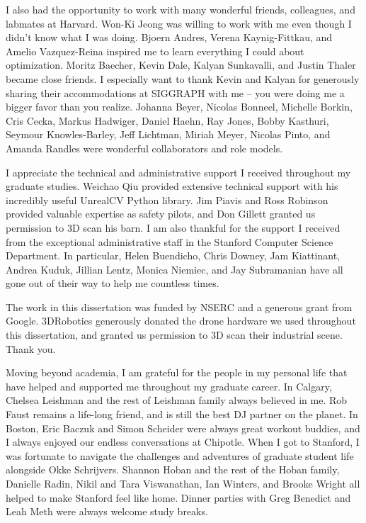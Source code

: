 I also had the opportunity to work with many wonderful friends, colleagues, and labmates at Harvard.
Won-Ki Jeong was willing to work with me even though I didn't know what I was doing.
Bjoern Andres, Verena Kaynig-Fittkau, and Amelio Vazquez-Reina inspired me to learn everything I could about optimization.
Moritz Baecher, Kevin Dale, Kalyan Sunkavalli, and Justin Thaler became close friends.
I especially want to thank Kevin and Kalyan for generously sharing their accommodations at SIGGRAPH with me -- you were doing me a bigger favor than you realize.  
Johanna Beyer, Nicolas Bonneel, Michelle Borkin, Cris Cecka, Markus Hadwiger, Daniel Haehn, Ray Jones, Bobby Kasthuri, Seymour Knowles-Barley,  Jeff Lichtman, Miriah Meyer, Nicolas Pinto, and Amanda Randles were wonderful collaborators and role models.

I appreciate the technical and administrative support I received throughout my graduate studies.
Weichao Qiu provided extensive technical support with his incredibly useful UnrealCV Python library.
Jim Piavis and Ross Robinson provided valuable expertise as safety pilots, and Don Gillett granted us permission to 3D scan his barn.
I am also thankful for the support I received from the exceptional administrative staff in the Stanford Computer Science Department.
In particular, Helen Buendicho, Chris Downey, Jam Kiattinant, Andrea Kuduk, Jillian Lentz, Monica Niemiec, and Jay Subramanian have all gone out of their way to help me countless times.

The work in this dissertation was funded by NSERC and a generous grant from Google.
3DRobotics generously donated the drone hardware we used throughout this dissertation, and granted us permission to 3D scan their industrial scene.
Thank you.

Moving beyond academia, I am grateful for the people in my personal life that have helped and supported me throughout my graduate career.
In Calgary, Chelsea Leishman and the rest of Leishman family always believed in me.
Rob Faust remains a life-long friend, and is still the best DJ partner on the planet.
In Boston, Eric Baczuk and Simon Scheider were always great workout buddies, and I always enjoyed our endless conversations at Chipotle.
When I got to Stanford, I was fortunate to navigate the challenges and adventures of graduate student life alongside Okke Schrijvers.
Shannon Hoban and the rest of the Hoban family, Danielle Radin, Nikil and Tara Viswanathan, Ian Winters, and Brooke Wright all helped to make Stanford feel like home.
Dinner parties with Greg Benedict and Leah Meth were always welcome study breaks.

